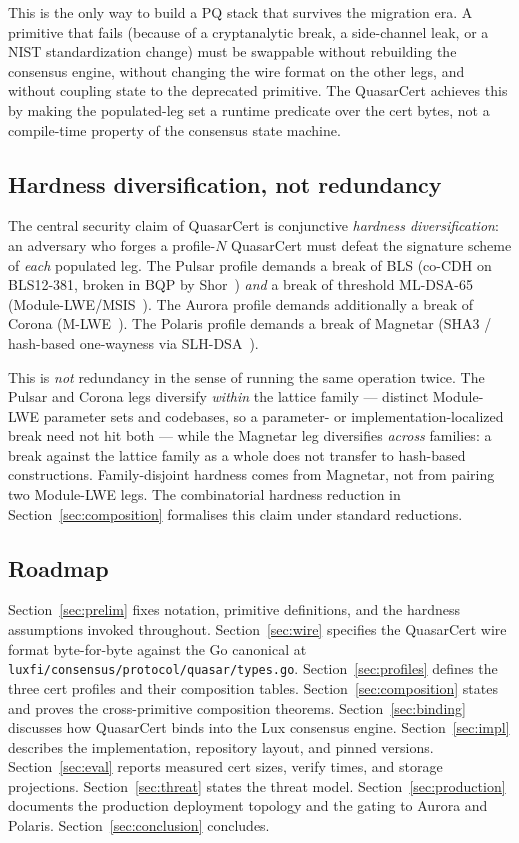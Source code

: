 This is the only way to build a PQ stack that survives the
migration era. A primitive that fails (because of a cryptanalytic
break, a side-channel leak, or a NIST standardization change) must be
swappable without rebuilding the consensus engine, without changing
the wire format on the other legs, and without coupling state to the
deprecated primitive. The QuasarCert achieves this by making the
populated-leg set a runtime predicate over the cert bytes, not a
compile-time property of the consensus state machine.

\subsection{Hardness diversification, not redundancy}

The central security claim of QuasarCert is conjunctive
\emph{hardness diversification}: an adversary who forges a profile-$N$
QuasarCert must defeat the signature scheme of \emph{each} populated
leg. The Pulsar profile demands a break of BLS (co-CDH on BLS12-381,
broken in BQP by Shor~\cite{shor1994}) \emph{and} a break of threshold
ML-DSA-65 (Module-LWE/MSIS~\cite{fips204,mlwe}). The Aurora profile
demands additionally a break of Corona (M-LWE~\cite{regev2009,
ringtail}). The Polaris profile demands a break of Magnetar
(SHA3 / hash-based one-wayness via SLH-DSA~\cite{fips205}).

This is \emph{not} redundancy in the sense of running the same
operation twice. The Pulsar and Corona legs diversify \emph{within}
the lattice family --- distinct Module-LWE parameter sets and
codebases, so a parameter- or implementation-localized break need
not hit both --- while the Magnetar leg diversifies \emph{across}
families: a break against the lattice family as a whole does not
transfer to hash-based constructions. Family-disjoint hardness comes
from Magnetar, not from pairing two Module-LWE legs. The combinatorial
hardness reduction in Section~\ref{sec:composition} formalises this
claim under standard reductions.

\subsection{Roadmap}

Section~\ref{sec:prelim} fixes notation, primitive definitions, and the
hardness assumptions invoked throughout. Section~\ref{sec:wire}
specifies the QuasarCert wire format byte-for-byte against the Go
canonical at \texttt{luxfi/consensus/protocol/quasar/types.go}.
Section~\ref{sec:profiles} defines the three cert profiles and their
composition tables. Section~\ref{sec:composition} states and proves
the cross-primitive composition theorems. Section~\ref{sec:binding}
discusses how QuasarCert binds into the Lux consensus engine.
Section~\ref{sec:impl} describes the implementation, repository
layout, and pinned versions. Section~\ref{sec:eval} reports measured
cert sizes, verify times, and storage projections.
Section~\ref{sec:threat} states the threat model.
Section~\ref{sec:production} documents the production deployment
topology and the gating to Aurora and Polaris.
Section~\ref{sec:conclusion} concludes.
